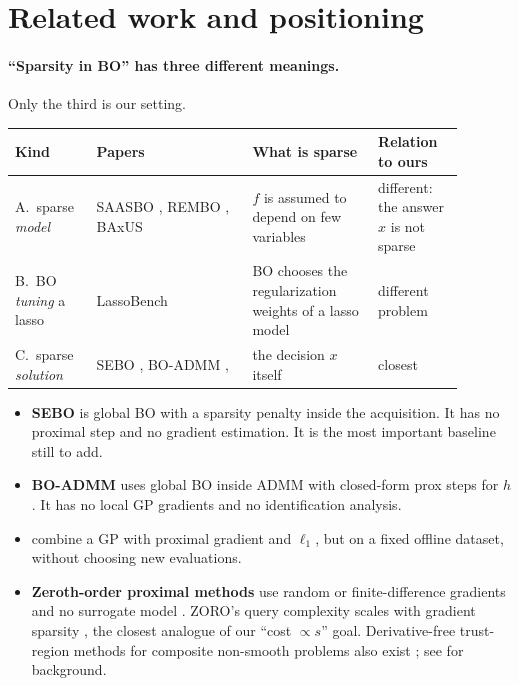 \documentclass[10pt]{article}
\theoremstyle{remark}
\begin{document}
\section{Related work and positioning}\label{sec:related}

\paragraph{``Sparsity in BO'' has three different meanings.} Only the third is our setting.
\begin{center}\small
\begin{tabular}{@{}L{0.16\linewidth}L{0.31\linewidth}L{0.25\linewidth}L{0.17\linewidth}@{}}
\toprule
Kind & Papers & What is sparse & Relation to ours\\\midrule
A.\ sparse \emph{model} & SAASBO \citep{eriksson2021saasbo}, REMBO \citep{wang2016rembo}, BAxUS \citep{papenmeier2022baxus} &
$f$ is assumed to depend on few variables & different: the answer $x$ is not sparse\\[2pt]
B.\ BO \emph{tuning} a lasso & LassoBench \citep{sehic2022lassobench} & BO chooses the regularization weights of a lasso model & different problem\\[2pt]
C.\ sparse \emph{solution} & SEBO \citep{liu2023sebo}, BO-ADMM \citep{zhao2019boadmm}, \citet{mueller2017interventions} & the decision $x$ itself & closest\\
\bottomrule
\end{tabular}
\end{center}
\begin{itemize}
\item \textbf{SEBO} \citep{liu2023sebo} is global BO with a sparsity penalty inside the acquisition. It has no proximal step and no gradient estimation.
It is the most important baseline still to add.
\item \textbf{BO-ADMM} \citep{zhao2019boadmm} uses global BO inside ADMM with closed-form prox steps for $h$. It has no local GP gradients and no
identification analysis.
\item \textbf{\citet{mueller2017interventions}} combine a GP with proximal gradient and $\ell_1$, but on a fixed offline dataset, without choosing new evaluations.
\item \textbf{Zeroth-order proximal methods} use random or finite-difference gradients and no surrogate model
\citep{ghadimi2016mini,nesterov2017random,huang2019zoprox,cai2022zoro}. ZORO's query complexity scales with gradient sparsity \citep{cai2022zoro},
the closest analogue of our ``cost $\propto s$'' goal. Derivative-free trust-region methods for composite non-smooth problems also exist
\citep{davar2024trfd}; see \citep{conn2009dfo} for background.
\end{itemize}
\end{document}
